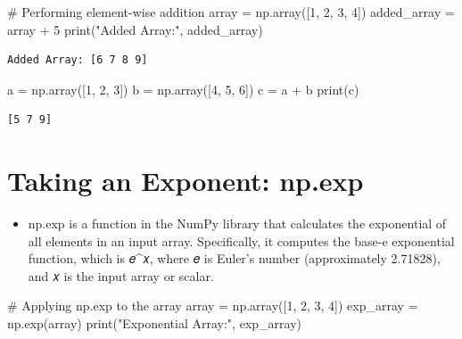 \documentclass[
  letterpaper,
  DIV=11,
  numbers=noendperiod]{scrreprt}
\newenvironment{Shaded}{\begin{snugshade}}{\end{snugshade}}
\newcommand{\BuiltInTok}[1]{\textcolor[rgb]{0.00,0.23,0.31}{#1}}
\newcommand{\CommentTok}[1]{\textcolor[rgb]{0.37,0.37,0.37}{#1}}
\newcommand{\DecValTok}[1]{\textcolor[rgb]{0.68,0.00,0.00}{#1}}
\newcommand{\NormalTok}[1]{\textcolor[rgb]{0.00,0.23,0.31}{#1}}
\newcommand{\OperatorTok}[1]{\textcolor[rgb]{0.37,0.37,0.37}{#1}}
\newcommand{\StringTok}[1]{\textcolor[rgb]{0.13,0.47,0.30}{#1}}
\providecommand{\tightlist}{%
  \setlength{\itemsep}{0pt}\setlength{\parskip}{0pt}}\usepackage{longtable,booktabs,array}
\begin{document}
\begin{Shaded}
\begin{Highlighting}[]
\CommentTok{\# Performing element{-}wise addition}
\NormalTok{array }\OperatorTok{=}\NormalTok{ np.array([}\DecValTok{1}\NormalTok{, }\DecValTok{2}\NormalTok{, }\DecValTok{3}\NormalTok{, }\DecValTok{4}\NormalTok{])}
\NormalTok{added\_array }\OperatorTok{=}\NormalTok{ array }\OperatorTok{+} \DecValTok{5}
\BuiltInTok{print}\NormalTok{(}\StringTok{"Added Array:"}\NormalTok{, added\_array)}
\end{Highlighting}
\end{Shaded}

\begin{verbatim}
Added Array: [6 7 8 9]
\end{verbatim}

\begin{Shaded}
\begin{Highlighting}[]
\NormalTok{a }\OperatorTok{=}\NormalTok{ np.array([}\DecValTok{1}\NormalTok{, }\DecValTok{2}\NormalTok{, }\DecValTok{3}\NormalTok{])}
\NormalTok{b }\OperatorTok{=}\NormalTok{ np.array([}\DecValTok{4}\NormalTok{, }\DecValTok{5}\NormalTok{, }\DecValTok{6}\NormalTok{])}
\NormalTok{c }\OperatorTok{=}\NormalTok{ a }\OperatorTok{+}\NormalTok{ b}
\BuiltInTok{print}\NormalTok{(c)}
\end{Highlighting}
\end{Shaded}

\begin{verbatim}
[5 7 9]
\end{verbatim}

\section{Taking an Exponent: np.exp}\label{taking-an-exponent-np.exp}

\begin{itemize}
\tightlist
\item
  np.exp is a function in the NumPy library that calculates the
  exponential of all elements in an input array. Specifically, it
  computes the base-e exponential function, which is 𝑒\^{}𝑥, where 𝑒 is
  Euler's number (approximately 2.71828), and 𝑥 is the input array or
  scalar.
\end{itemize}

\begin{Shaded}
\begin{Highlighting}[]
\CommentTok{\# Applying np.exp to the array}
\NormalTok{array }\OperatorTok{=}\NormalTok{ np.array([}\DecValTok{1}\NormalTok{, }\DecValTok{2}\NormalTok{, }\DecValTok{3}\NormalTok{, }\DecValTok{4}\NormalTok{])}
\NormalTok{exp\_array }\OperatorTok{=}\NormalTok{ np.exp(array)}
\BuiltInTok{print}\NormalTok{(}\StringTok{"Exponential Array:"}\NormalTok{, exp\_array)}
\end{Highlighting}
\end{Shaded}
\end{document}
